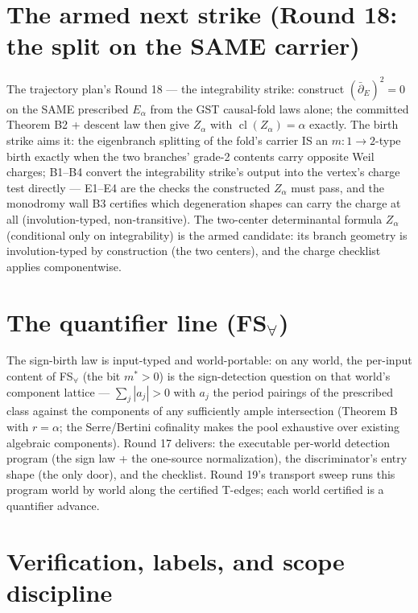 \documentclass[11pt]{article}
\newcommand{\Cl}{\operatorname{cl}}
\begin{document}
\section{The armed next strike (Round 18: the split on the SAME carrier)}

The trajectory plan's Round 18 --- the integrability strike: construct
$(\bar\partial_E)^2 = 0$ on the SAME prescribed $E_\alpha$ from the GST
causal-fold laws alone; the committed Theorem B2 + descent law then give
$Z_\alpha$ with $\Cl(Z_\alpha) = \alpha$ exactly. The birth strike aims it:
the eigenbranch splitting of the fold's carrier IS an $m{:}1 \to 2$-type
birth exactly when the two branches' grade-2 contents carry opposite
Weil charges; B1--B4 convert the integrability strike's output into the
vertex's charge test directly --- E1--E4 are the checks the constructed
$Z_\alpha$ must pass, and the monodromy wall B3 certifies which degeneration
shapes can carry the charge at all (involution-typed, non-transitive). The
two-center determinantal formula $Z_\alpha$ (conditional only on
integrability) is the armed candidate: its branch geometry is
involution-typed by construction (the two centers), and the charge checklist
applies componentwise.

\section{The quantifier line (FS$_\forall$)}

The sign-birth law is input-typed and world-portable: on any world, the
per-input content of FS$_\forall$ (the bit $m^* > 0$) is the sign-detection
question on that world's component lattice --- $\sum_j |a_j| > 0$ with
$a_j$ the period pairings of the prescribed class against the components of
any sufficiently ample intersection (Theorem B with $r = \alpha$; the
Serre/Bertini cofinality makes the pool exhaustive over existing algebraic
components). Round 17 delivers: the executable per-world detection program
(the sign law + the one-source normalization), the discriminator's entry
shape (the only door), and the checklist. Round 19's transport sweep runs
this program world by world along the certified T-edges; each world
certified is a quantifier advance.

\section{Verification, labels, and scope discipline}
\label{sec:verify}
\end{document}
